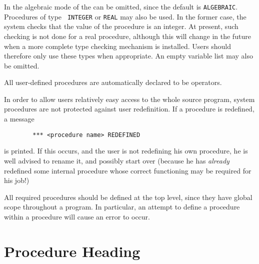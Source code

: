 In the algebraic mode of {\REDUCE} the {\tt <procedure type>} can be
omitted, since the default is {\tt ALGEBRAIC}.  Procedures of type {\tt
INTEGER} or {\tt REAL} may also be used.  In the former case, the system
checks that the value of the procedure is an integer.  At present, such
checking is not done for a real procedure, although this will change in
the future when a more complete type checking mechanism is installed.
Users should therefore only use these types when appropriate.  An empty
variable list may also be omitted.

All user-defined procedures are automatically declared to be operators.

In order to allow users relatively easy access to the whole {\REDUCE} source
program, system procedures are not protected against user redefinition. If
a procedure is redefined, a message
\begin{verbatim}
        *** <procedure name> REDEFINED
\end{verbatim}
is printed. If this occurs, and the user is not redefining his own
procedure, he is well advised to rename it, and possibly start over
(because he has {\em already} redefined some internal procedure whose correct
functioning may be required for his job!)

All required procedures should be defined at the top level, since they
have global scope throughout a program. In particular, an attempt to
define a procedure within a procedure will cause an error to occur.

\section{Procedure Heading} 

